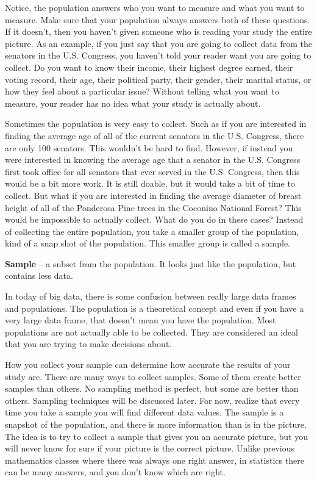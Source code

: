\documentclass[
]{book}
\begin{document}
Notice, the population answers who you want to measure and what you want to measure. Make sure that your population always answers both of these questions. If it doesn't, then you haven't given someone who is reading your study the entire picture. As an example, if you just say that you are going to collect data from the senators in the U.S. Congress, you haven't told your reader want you are going to collect. Do you want to know their income, their highest degree earned, their voting record, their age, their political party, their gender, their marital status, or how they feel about a particular issue? Without telling what you want to measure, your reader has no idea what your study is actually about.

Sometimes the population is very easy to collect. Such as if you are interested in finding the average age of all of the current senators in the U.S. Congress, there are only 100 senators. This wouldn't be hard to find. However, if instead you were interested in knowing the average age that a senator in the U.S. Congress first took office for all senators that ever served in the U.S. Congress, then this would be a bit more work. It is still doable, but it would take a bit of time to collect. But what if you are interested in finding the average diameter of breast height of all of the Ponderosa Pine trees in the Coconino National Forest? This would be impossible to actually collect. What do you do in these cases? Instead of collecting the entire population, you take a smaller group of the population, kind of a snap shot of the population. This smaller group is called a sample.

\textbf{Sample} -- a subset from the population. It looks just like the population, but contains less data.

In today of big data, there is some confusion between really large data frames and populations. The population is a theoretical concept and even if you have a very large data frame, that doesn't mean you have the population. Most populations are not actually able to be collected. They are considered an ideal that you are trying to make decisions about.

How you collect your sample can determine how accurate the results of your study are. There are many ways to collect samples. Some of them create better samples than others. No sampling method is perfect, but some are better than others. Sampling techniques will be discussed later. For now, realize that every time you take a sample you will find different data values. The sample is a snapshot of the population, and there is more information than is in the picture. The idea is to try to collect a sample that gives you an accurate picture, but you will never know for sure if your picture is the correct picture. Unlike previous mathematics classes where there was always one right answer, in statistics there can be many answers, and you don't know which are right.
\end{document}
